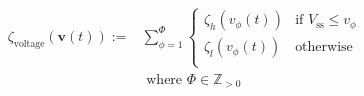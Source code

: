 \begin{equation}
\begin{split}
	\zeta_\text{voltage}(\textbf{v}(t)) :=& \sum_{\phi=1}^{\Phi}{\begin{cases}
		\zeta_h(v_{\phi}(t)) & \text{if } V_\text{ss} \leq v_\phi\\
		\zeta_l(v_{\phi}(t)) & \text{otherwise}\\
	\end{cases}}\\
	&\text{ where } \Phi \in \mathbb{Z}_{>0}
\end{split}
\label{ch1:equ:voltage-deviation}
\end{equation}

